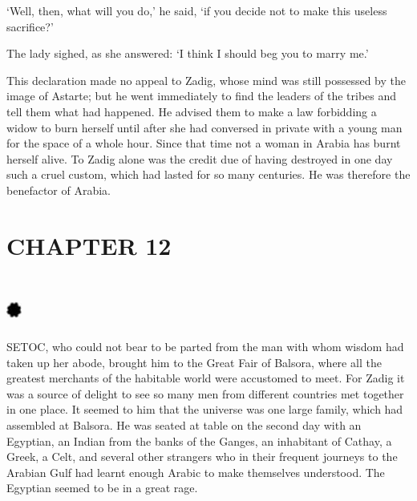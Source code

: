 \documentclass{article}
\begin{document}
\begin{center}
`Well, then, what will you do,' he said, `if you decide not to make this useless 
sacrifice?' 

The lady sighed, as she answered: `I think I should beg you to marry me.' 

This declaration made no appeal to Zadig, whose mind was still possessed by the 
image of Astarte; but he went immediately to find the leaders of the tribes and 
tell them what had happened. He advised them to make a law forbidding a widow to 
burn herself until after she had conversed in private with a young man for the 
space of a whole hour. Since that time not a woman in Arabia has burnt herself 
alive. To Zadig alone was the credit due of having destroyed in one day such a 
cruel custom, which had lasted for so many centuries. He was therefore the benefactor 
of Arabia.\pagebreak{} 

\section*{\textbf{CHAPTER 12 }}

\section*{%
\includegraphics[width=14pt, height=15pt, keepaspectratio=true]{Zadig or L'Ingenu - Voltaire-fig015.jpg}
}

 

SETOC, who could not bear to be parted from the man with whom wisdom had taken 
up her abode, brought him to the Great Fair of Balsora, where all the greatest 
merchants of the habitable world were accustomed to meet. For Zadig it was a source 
of delight to see so many men from different countries met together in one place. 
It seemed to him that the universe was one large family, which had assembled at 
Balsora. He was seated at table on the second day with an Egyptian, an Indian from 
the banks of the Ganges, an inhabitant of Cathay, a Greek, a Celt, and several 
other strangers who in their frequent journeys to the Arabian Gulf had learnt enough 
Arabic to make themselves understood. The Egyptian seemed to be in a great rage. 


\end{center}
\end{document}
